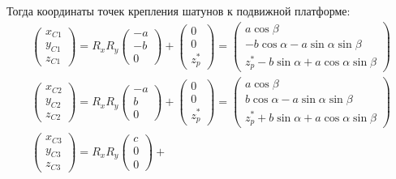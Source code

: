 Тогда координаты точек крепления шатунов к подвижной платформе:
\begin{equation}
\label{eq:KinematicsUpperPoints}
	\begin{aligned}
		\left(\begin{array}{ccc} x_{C1} \\ y_{C1} \\ z_{C1} \end{array}\right) = R_x R_y
		\left(\begin{array}{ccc} -a \\ -b \\ 0	\end{array}\right) +
		\left(\begin{array}{ccc} 0 \\ 0 \\ z_p^* \end{array}\right) =
		\left(\begin{array}{lr}
				a\cos{\beta} \\
				-b\cos{\alpha}-a\sin{\alpha}\sin{\beta} \\
				z_p^* - b\sin{\alpha} + a\cos{\alpha}\sin{\beta}\end{array}\right)\\
		\left(\begin{array}{ccc} x_{C2} \\ y_{C2} \\ z_{C2} \end{array}\right) = R_x R_y
		\left(\begin{array}{ccc} -a \\ b \\ 0	\end{array}\right) +
		\left(\begin{array}{ccc} 0 \\ 0 \\ z_p^* \end{array}\right) =
		\left(\begin{array}{lr}
				a\cos{\beta} \\
				b\cos{\alpha}-a\sin{\alpha}\sin{\beta} \\
				z_p^* + b\sin{\alpha} + a\cos{\alpha}\sin{\beta}\end{array}\right)\\
		\left(\begin{array}{ccc} x_{C3} \\ y_{C3} \\ z_{C3} \end{array}\right) = R_x R_y
		\left(\begin{array}{ccc} c \\ 0 \\ 0	\end{array}\right) +

\end{aligned}
\end{equation}
